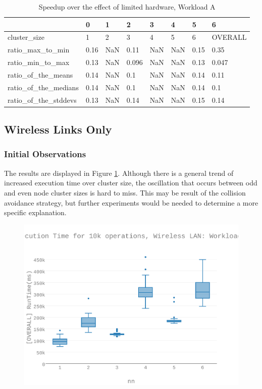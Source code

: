\begin{table}[H]
\centering
\begin{tabular}{llllllll}
\toprule
{} &    0 &    1 &     2 &    3 &    4 &    5 &        6 \\
\midrule
cluster\_size         &    1 &    2 &     3 &    4 &    5 &    6 &  OVERALL \\
ratio\_max\_to\_min     & 0.16 &  NaN &  0.11 &  NaN &  NaN & 0.15 &     0.35 \\
ratio\_min\_to\_max     & 0.13 &  NaN & 0.096 &  NaN &  NaN & 0.13 &    0.047 \\
ratio\_of\_the\_means   & 0.14 &  NaN &   0.1 &  NaN &  NaN & 0.14 &     0.11 \\
ratio\_of\_the\_medians & 0.14 &  NaN &   0.1 &  NaN &  NaN & 0.14 &      0.1 \\
ratio\_of\_the\_stddevs & 0.13 &  NaN &  0.14 &  NaN &  NaN & 0.15 &     0.14 \\
\bottomrule
\end{tabular}
\caption{Speedup over the effect of limited hardware, Workload A}
\label{table:rp_v_vm_a_speedup}
\end{table}





\subsection{Wireless Links Only}
\subsubsection{Initial Observations}
The results are displayed in Figure \ref{figures-wla_fig8}.  Although there is a general trend of increased execution time over cluster size, the oscillation that occurs between odd and even node cluster sizes is hard to miss. This may be result of the collision avoidance strategy, but further experiments would be needed to determine a more specific explanation. \begin{figure}[h]
\includegraphics[width=5.5in]{Figures/figures-wla_fig8.pdf}
\caption{}
\label{figures-wla_fig8}
\end{figure}



